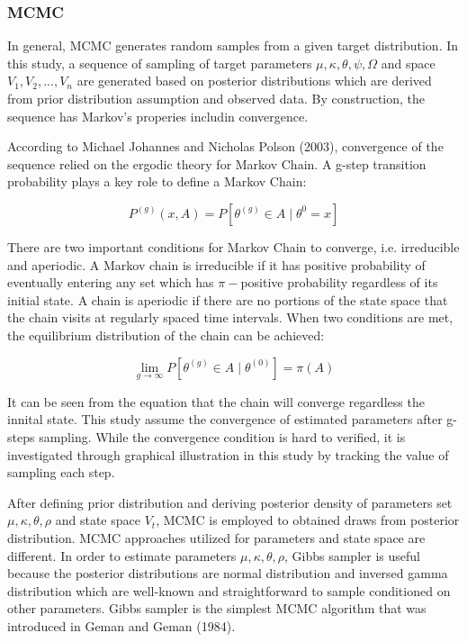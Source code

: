 \documentclass[12pt,a4paper]{article}
\numberwithin{equation}{section}
\begin{document}
\subsubsection{MCMC}

In general, MCMC generates random samples from a given target distribution. In this study, a sequence of sampling of target parameters $\mu, \kappa, \theta, \psi, \Omega$ and space $V_1, V_2, ..., V_n$ are generated based on posterior distributions which are derived from prior distribution assumption and observed data. By construction, the sequence has Markov's properies includin convergence. 
 
According to Michael Johannes and Nicholas Polson (2003), convergence of the sequence relied on the ergodic theory for Markov Chain. A g-step transition probability plays a key role to define a Markov Chain:

\[P^{(g)} (x, A) = P[\theta^{(g)} \in A \mid \theta^0 = x]\]

There are two important conditions for Markov Chain to converge, i.e. irreducible and aperiodic. A Markov chain is irreducible if it has positive probability of eventually entering any set which has $\pi-$positive probability regardless of its initial state. A chain is aperiodic if there are no portions of the state space that the chain visits at regularly spaced time intervals. When two conditions are met, the equilibrium distribution of the chain can be achieved:

\[\lim_{g\rightarrow \infty} P[\theta^{(g)} \in A  \mid \theta^{(0)} ] = \pi(A)\]

It can be seen from the equation that the chain will converge regardless the innital state. This study assume the convergence of estimated parameters after g-steps sampling. While the convergence condition is hard to verified, it is investigated through graphical illustration in this study by tracking the value of sampling each step.

After defining prior distribution and deriving posterior density of parameters set $\mu, \kappa, \theta, \rho$ and state space $V_t$, MCMC is employed to obtained draws from posterior distribution. MCMC approaches utilized for parameters and state space are different. In order to estimate parameters $\mu, \kappa, \theta, \rho$, Gibbs sampler is useful because the posterior distributions are normal distribution and inversed gamma distribution which are well-known and straightforward to sample conditioned on other parameters. Gibbs sampler is the simplest MCMC algorithm that was introduced in Geman and Geman (1984). 
\end{document}
